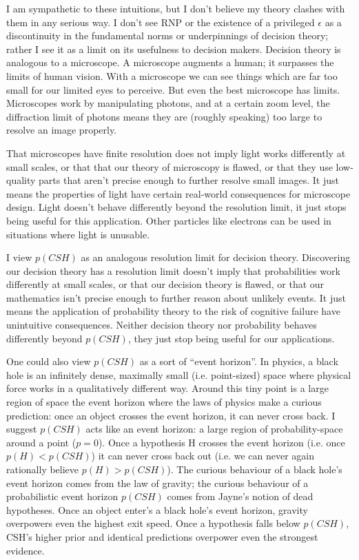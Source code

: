 \documentclass{article}
\begin{document}
I am sympathetic to these intuitions, but I don't believe my theory clashes with them in any serious way. I don't see RNP or the existence of a privileged \(\epsilon\) as a discontinuity in the fundamental norms or underpinnings of decision theory; rather I see it as a limit on its usefulness to decision makers. Decision theory is analogous to a microscope. A microscope augments a human; it surpasses the limits of human vision. With a microscope we can see things which are far too small for our limited eyes to perceive. But even the best microscope has limits. Microscopes work by manipulating photons, and at a certain zoom level, the diffraction limit of photons means they are (roughly speaking) too large to resolve an image properly. 

That microscopes have finite resolution does not imply light works differently at small scales, or that that our theory of microscopy is flawed, or that they use low-quality parts that aren't precise enough to further resolve small images. It just means the properties of light have certain real-world consequences for microscope design. Light doesn't behave differently beyond the resolution limit, it just stops being useful for this application. Other particles like electrons can be used in situations where light is unusable.

I view \(p(CSH)\) as an analogous resolution limit for decision theory. Discovering our decision theory has a resolution limit doesn't imply that probabilities work differently at small scales, or that our decision theory is flawed, or that our mathematics isn't precise enough to further reason about unlikely events. It just means the application of probability theory to the risk of cognitive failure have unintuitive consequences. Neither decision theory nor probability behaves differently beyond \(p(CSH)\), they just stop being useful for our applications. 

One could also view \(p(CSH)\) as a sort of ``event horizon''. In physics, a black hole is an infinitely dense, maximally small (i.e. point-sized) space where physical force works in a qualitatively different way. Around this tiny point is a large region of space \textemdash{} the event horizon \textemdash{} where the laws of physics make a curious prediction: once an object crosses the event horizon, it can never cross back. I suggest \(p(CSH)\) acts like an event horizon: a large region of probability-space around a point (\(p=0\)). Once a hypothesis H crosses the event horizon (i.e. once \(p(H)<p(CSH)\)) it can never cross back out (i.e. we can never again rationally believe \(p(H)>p(CSH)\)). The curious behaviour of a black hole's event horizon comes from the law of gravity; the curious behaviour of a probabilistic event horizon \(p(CSH)\) comes from Jayne's notion of dead hypotheses. Once an object enter's a black hole's event horizon, gravity overpowers even the highest exit speed. Once a hypothesis falls below \(p(CSH)\), CSH's higher prior and identical predictions overpower even the strongest evidence. 
\end{document}
